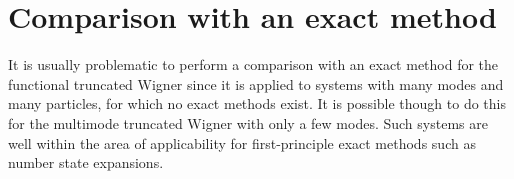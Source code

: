 \section{Comparison with an exact method}
\label{sec:wigner-bec:mm}

It is usually problematic to perform a comparison with an exact method for the functional truncated Wigner since it is applied to systems with many modes and many particles, for which no exact methods exist.
It is possible though to do this for the multimode truncated Wigner with only a few modes.
Such systems are well within the area of applicability for first-principle exact methods such as number state expansions.

